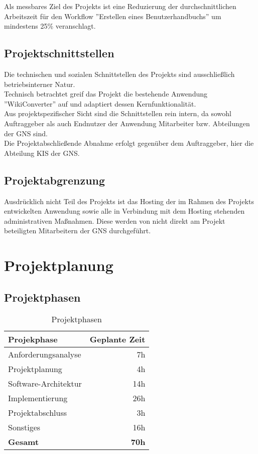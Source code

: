 \documentclass[12pt, xcolor=dvipsnames]{scrartcl}
\begin{document}
Als messbares Ziel des Projekts ist eine Reduzierung der durchschnittlichen Arbeitszeit für den Workflow ''Erstellen eines Benutzerhandbuchs'' um mindestens 25\% veranschlagt.


\subsection{Projektschnittstellen}

Die technischen und sozialen Schnittstellen des Projekts sind ausschließlich betriebsinterner Natur. \\
Technisch betrachtet greif das Projekt die bestehende Anwendung ''WikiConverter'' auf und adaptiert dessen Kernfunktionalität. \\
Aus projektspezifischer Sicht sind die Schnittstellen rein intern, da sowohl Auftraggeber als auch Endnutzer der Anwendung Mitarbeiter bzw. Abteilungen der GNS sind. \\
Die Projektabschließende Abnahme erfolgt gegenüber dem Auftraggeber, hier die Abteilung KIS der GNS.


\subsection{Projektabgrenzung}
\label{sec:projektabgrenzung}

Ausdrücklich nicht Teil des Projekts ist das Hosting der im Rahmen des Projekts entwickelten Anwendung sowie alle in Verbindung mit dem Hosting stehenden administrativen Maßnahmen. Diese werden von nicht direkt am Projekt beteiligten Mitarbeitern der GNS durchgeführt.


\section{Projektplanung}

\subsection{Projektphasen}

	\begin{table}[H]
	\centering
	\begin{tabular}{lr}

		\rowcolor{white!15}				
		\textbf{Projekphase} & \textbf{Geplante Zeit} \\\hline
		
	    Anforderungsanalyse & 7h \\	   	   
	    Projektplanung & 4h \\	   			
	    Software-Architektur & 14h \\	 				
	    Implementierung & 26h \\	   				
	    Projektabschluss & 3h \\	   				
	    Sonstiges & 16h \\\hline
	  		
		\rowcolor{white!15}				
		\textbf{Gesamt} & \textbf{70h}				
			    
	\end{tabular}
	\caption{Projektphasen}
	\label{tab:projektphasen}
	\end{table}
	
\end{document}

